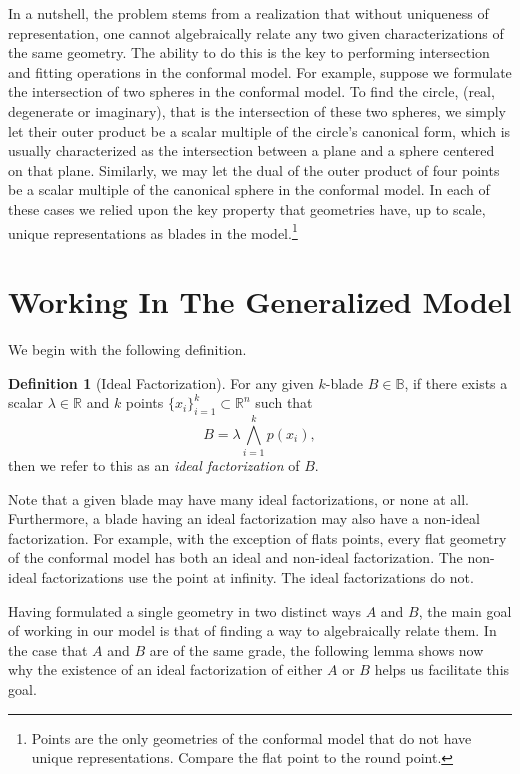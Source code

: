 \documentclass{birkjour}
\theoremstyle{definition}
\newtheorem{defn}[thm]{Definition}
\theoremstyle{remark}
\numberwithin{equation}{section}
\newcommand{\R}{\mathbb{R}}
\newcommand{\B}{\mathbb{B}}
\begin{document}
In a nutshell, the problem stems from a realization that without uniqueness of representation,
one cannot algebraically relate any two given characterizations of the same geometry.
The ability to do this is the key to performing intersection and fitting operations in the conformal model.
For example, suppose we formulate the intersection of two spheres in the conformal model.
To find the circle, (real, degenerate or imaginary), that is the intersection of these two spheres,
we simply let their outer product be a scalar multiple of the circle's canonical form, which is usually
characterized as the intersection between a plane and a sphere centered on that plane.
Similarly, we may let the dual of the outer product of four points be a scalar multiple of the
canonical sphere in the conformal model.  In each of these cases we relied upon the key
property that geometries have, up to scale, unique representations
as blades in the model.\footnote{Points are the only geometries of the conformal model
that do not have unique representations.  Compare the flat point to the round point.}

\section{Working In The Generalized Model}

We begin with the following definition.
\begin{defn}[Ideal Factorization]
For any given $k$-blade $B\in\B$, if there exists a scalar $\lambda\in\R$ and $k$ points $\{x_i\}_{i=1}^k\subset\R^n$
such that
\begin{equation*}
B = \lambda\bigwedge_{i=1}^k p(x_i),
\end{equation*}
then we refer to this as an {\it ideal factorization} of $B$.
\end{defn}

Note that a given blade may have many ideal factorizations, or none at all.  Furthermore, a blade
having an ideal factorization may also have a non-ideal factorization.  For example, with the exception
of flats points, every flat geometry of the conformal model has both an ideal and non-ideal factorization.
The non-ideal factorizations use the point at infinity.  The ideal factorizations do not.

Having formulated a single geometry in two distinct ways $A$ and $B$, the main goal of working in our model is
that of finding a way to algebraically relate them.  In the case that $A$ and $B$ are of the same
grade, the following lemma shows now why the existence of an
ideal factorization of either $A$ or $B$ helps us facilitate this goal.
\end{document}
